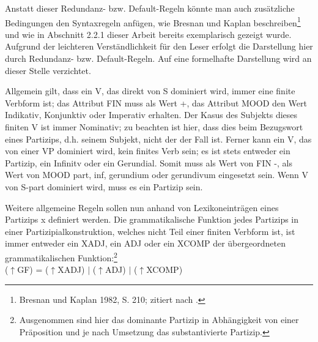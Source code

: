 \documentclass[12pt,a4paper]{article}
\begin{document}
Anstatt dieser Redundanz- bzw. Default-Regeln könnte man auch zusätzliche Bedingungen den Syntaxregeln anfügen, wie Bresnan und Kaplan beschreiben\footnote{Bresnan und Kaplan 1982, S. 210; zitiert nach \cite[54]{Rohrer}.} und wie in Abschnitt 2.2.1 dieser Arbeit bereits exemplarisch gezeigt wurde. Aufgrund der leichteren Verständlichkeit für den Leser erfolgt die Darstellung hier durch Redundanz- bzw. Default-Regeln. Auf eine formelhafte Darstellung wird an dieser Stelle verzichtet.

Allgemein gilt, dass ein V, das direkt von S dominiert wird, immer eine
finite Verbform ist; das Attribut FIN muss als Wert +, das Attribut MOOD den Wert Indikativ, Konjunktiv oder Imperativ erhalten.
Der Kasus des Subjekts dieses finiten V ist immer Nominativ; zu beachten ist hier, dass dies beim Bezugswort eines Partizips, d.h. seinem Subjekt, nicht der der Fall ist.
Ferner kann ein V, das von einer VP dominiert wird, kein finites Verb sein; es ist stets entweder ein Partizip, ein Infinitv oder ein Gerundial. Somit muss als Wert von FIN -, als Wert von MOOD part, inf, gerundium  oder gerundivum eingesetzt sein.
Wenn V von S-part dominiert wird, muss es ein Partizip sein.



Weitere allgemeine Regeln sollen nun anhand von Lexikoneinträgen eines Partizips x definiert werden.
Die grammatikalische Funktion jedes Partizips in einer Partizipialkonstruktion, welches nicht Teil einer finiten Verbform ist, ist immer entweder ein XADJ, ein ADJ oder ein XCOMP der übergeordneten grammatikalischen Funktion:\footnote{Ausgenommen sind hier das dominante Partizip in Abhängigkeit von einer Präposition und je nach Umsetzung das substantivierte Partizip.} \\
($\uparrow$GF) = ($\uparrow$XADJ) $\mid$ ($\uparrow$ADJ) $\mid$ ($\uparrow$XCOMP)
\end{document}
